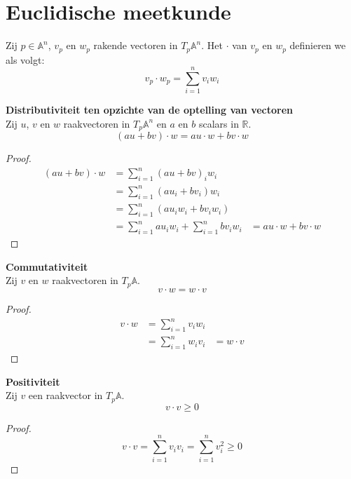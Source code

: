 \documentclass[main.tex]{subfiles}
\begin{document}
\chapter{Euclidische meetkunde}
\label{cha:euclidische-meetkunde}

\begin{de}
  Zij $p\in\mathbb{A}^{n}$, $v_{p}$ en $w_{p}$ rakende vectoren in $T_{p}\mathbb{A}^{n}$.
  Het  $\cdot$ van $v_{p}$ en $w_{p}$ definieren we als volgt:
  \[ v_{p} \cdot w_{p} = \sum_{i=1}^{n}v_{i}w_{i} \]
\end{de}

\begin{ei}
  \textbf{Distributiviteit ten opzichte van de optelling van vectoren}\\
  Zij $u$, $v$ en $w$ raakvectoren in $T_{p}\mathbb{A}^{n}$ en $a$ en $b$ scalars in $\mathbb{R}$.
  \[ (au + bv) \cdot w = au\cdot w + bv \cdot w \]

  \begin{proof}
    \[
    \begin{array}{rll}
      (au + bv) \cdot w &= \sum_{i=1}^{n}(au + bv)_{i}w_{i} &\\
                        &= \sum_{i=1}^{n}(au_{i} + bv_{i})w_{i} &\\
                        &= \sum_{i=1}^{n}(au_{i}w_{i} + bv_{i}w_{i}) &\\
                        &= \sum_{i=1}^{n}au_{i}w_{i} + \sum_{i=1}^{n}bv_{i}w_{i} &= au\cdot w + bv \cdot w
    \end{array}
    \]
  \end{proof}
\end{ei}

\begin{ei}
  \textbf{Commutativiteit}\\
  Zij $v$ en $w$ raakvectoren in $T_{p}\mathbb{A}$.
  \[ v\cdot w = w\cdot v\]
  \begin{proof}
    \[ 
    \begin{array}{rll}
      v\cdot w &= \sum_{i=1}^{n}v_{i}w_{i} &\\
               &= \sum_{i=1}^{n}w_{i}v_{i} &= w \cdot v
    \end{array}
    \]
  \end{proof}
\end{ei}

\begin{ei}
  \textbf{Positiviteit}\\
  Zij $v$ een raakvector in $T_{p}\mathbb{A}$.
  \[ v \cdot v \ge 0 \]

  \begin{proof}
    \[
    v \cdot v =  \sum_{i=1}^{n}v_{i}v_{i} = \sum_{i=1}^{n}v_{i}^{2} \ge 0
    \]
  \end{proof}
\end{ei}
\end{document}
